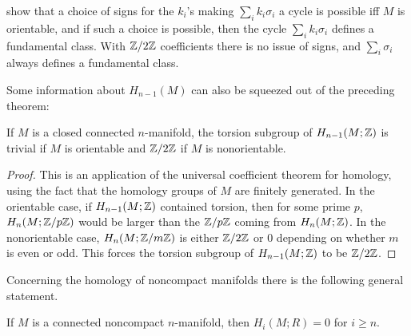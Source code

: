 show that a choice of signs for the $k_i$'s making $\sum_ik_i\sigma_i$ a cycle is possible iff $M$ is orientable, and if such a choice is possible, then the cycle $\sum_ik_i\sigma_i$ defines a fundamental class. With $\mathbb{Z}/2\mathbb{Z}$ coefficients there is no issue of signs, and $\sum_i\sigma_i$ always defines
a fundamental class.\par
Some information about $H_{n-1}(M)$ can also be squeezed out of the preceding
theorem:
\begin{corollary}\label{homology n-mani n-1}
If $M$ is a closed connected $n$-manifold, the torsion subgroup of $H_{n-1}(M;\mathbb{Z})$ is trivial if $M$ is orientable and $\mathbb{Z}/2\mathbb{Z}$ if $M$ is nonorientable.
\end{corollary}
\begin{proof}
This is an application of the universal coefficient theorem for homology, using the fact that the homology groups of $M$ are finitely generated. In the orientable case, if $H_{n-1}(M;\mathbb{Z})$ contained torsion, then for some prime $p$, $H_n(M;\mathbb{Z}/p\mathbb{Z})$ would be larger than the $\mathbb{Z}/p\mathbb{Z}$ coming from $H_n(M;\mathbb{Z})$. In the nonorientable case, $H_n(M;\mathbb{Z}/m\mathbb{Z})$ is either $\mathbb{Z}/2\mathbb{Z}$ or $0$ depending on whether $m$ is even or odd. This forces the torsion subgroup of $H_{n-1}(M;\mathbb{Z})$ to be $\mathbb{Z}/2\mathbb{Z}$.
\end{proof}
Concerning the homology of noncompact manifolds there is the following general statement.
\begin{proposition}
If $M$ is a connected noncompact $n$-manifold, then $H_i(M;R)=0$ for $i\geq n$.
\end{proposition}
